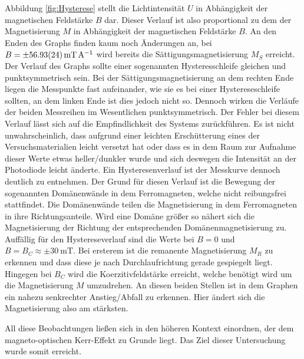 	Abbildung \ref{fig:Hysterese} stellt die Lichtintensität $U$ in Abhängigkeit der magnetischen Feldstärke $B$ dar.
	Dieser Verlauf ist also proportional zu dem der Magnetisierung $M$ in Abhängigkeit der magnetischen Feldstärke $B$.
	An den Enden des Graphs finden kaum noch Änderungen an, bei $B = \pm\SI{56.93+-0.24}{\milli\tesla\per\ampere}$ wird bereits die Sättigungsmagnetisierung $M_S$ erreicht.
	Der Verlauf des Graphs sollte einer sogenannten Hysteresschleife gleichen und punktsymmetrisch sein.
	Bei der Sättigungsmagnetisierung an dem rechten Ende liegen die Messpunkte fast aufeinander, wie sie es bei einer Hystereseschleife sollten, an dem linken Ende ist dies jedoch nicht so.
	Dennoch wirken die Verläufe der beiden Messreihen im Wesentlichen punktsymmetrisch.
	Der Fehler bei diesem Verlauf lässt sich auf die Empfindlichkeit des Systems zurückführen.
	Es ist nicht unwahrscheinlich, dass aufgrund einer leichten Erschütterung eines der Versuchsmaterialien leicht versetzt hat oder dass es in dem Raum zur Aufnahme dieser Werte etwas heller/dunkler wurde und sich deswegen die Intensität an der Photodiode leicht änderte.
	Ein Hysteresenverlauf ist der Messkurve dennoch deutlich zu entnehmen.
	Der Grund für diesen Verlauf ist die Bewegung der sogenannten Domänenwände in dem Ferromagneten, welche nicht reibungsfrei stattfindet.
	Die Domänenwände teilen die Magnetisierung in dem Ferromagneten in ihre Richtungsanteile.
	Wird eine Domäne größer so nähert sich die Magnetisierung der Richtung der entsprechenden Domänenmagnetisierung zu.
	Auffällig für den Hystereseverlauf sind die Werte bei $B = 0$ und $B = B_C \approx \pm \SI{30}{\milli\tesla}$.
	Bei ersterem ist die remanente Magnetisierung $M_R$ zu erkennen und dass diese je nach Durchlaufrichtung gerade gespiegelt liegt.
	Hingegen bei $B_C$ wird die Koerzitivfeldstärke erreicht, welche benötigt wird um die Magnetisierung $M$ umzudrehen.
	An diesen beiden Stellen ist in dem Graphen ein nahezu senkrechter Anstieg/Abfall zu erkennen.
	Hier ändert sich die Magnetisierung also am stärksten.
	
	All diese Beobachtungen ließen sich in den höheren Kontext einordnen, der dem magneto-optischen Kerr-Effekt zu Grunde liegt.
	Das Ziel dieser Untersuchung wurde somit erreicht.
	